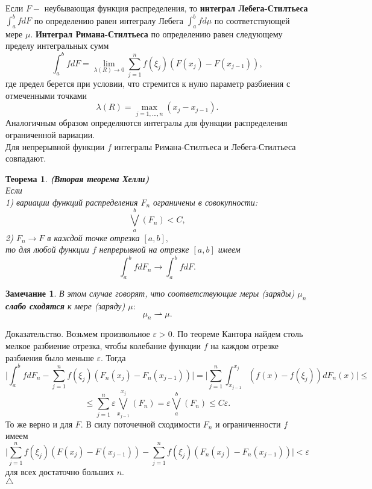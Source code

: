\documentclass[12 pt, a4 paper]{article}
\theoremstyle{plain}   \newtheorem{Pro}{Задача}
\newtheorem{Rem}{Замечание}
\newtheorem{The}{Теорема}
\begin{document}
Если
$ F - $
неубывающая функция распределения, то
{\bfseries интеграл Лебега-Стилтьеса}
$ \int _a ^b f dF $
по определению равен интегралу Лебега
$ \int _a ^b f d \mu $
по соответствующей мере
$ \mu . $
{\bfseries Интеграл Римана-Стилтьеса}
по определению равен следующему пределу интегральных сумм
$$
  \int _a ^b fdF = \lim _{\lambda (R) \rightarrow 0}
  \sum _{j=1}^n f(\xi _j )
  (F(x_j )-F(x_{j-1})),
$$
где предел берется при условии, что стремится к нулю параметр
разбиения с отмеченными точками
$$
  \lambda (R) = \max _{j=1,...,n} (x_j -x_{j-1}).
$$
Аналогичным образом определяются интегралы для функции распределения
ограниченной вариации.\\
Для непрерывной функции
$ f $
интегралы Римана-Стилтьеса и Лебега-Стилтьеса совпадают.
\begin{The}
{\bfseries (Вторая теорема Хелли)}\\
Если\\
1) вариации функций распределения
$ F_n $
ограничены в совокупности:
$$
  \bigvee _a ^b (F_n )<C,
$$
2) $ F_n \rightarrow F $
в каждой точке отрезка
$ [a,b] , $
\\
то для любой функции
$ f $
непрерывной на отрезке
$ [a,b] $
имеем
$$
  \int _a ^b fdF_n \rightarrow \int _a ^b fdF .
$$
\end{The}
\begin{Rem}
В этом случае говорят, что соответствующие меры (заряды)
$ \mu _n $
{\bfseries слабо сходятся}
к мере (заряду)
$ \mu : $
$$
  \mu _n \rightharpoonup \mu .
$$
\end{Rem}
{\Large Доказательство.}
Возьмем произвольное
$ \varepsilon >0 . $
По теореме Кантора найдем столь мелкое разбиение отрезка,
чтобы колебание функции
$ f $
на каждом отрезке разбиения было меньше
$ \varepsilon . $
Тогда
$$
  \biggl | \int _a ^b fdF_n -
  \sum _{j=1}^n f(\xi _j )(F_n (x_j )-F_n (x_{j-1}))
  \biggr | = \biggl | \sum _{j=1}^n \int _{x_{j-1}}^{x_j}
  (f(x)-f(\xi _j ))dF_n (x) \biggr | \leq
$$
$$
  \leq \sum _{j=1}^n \varepsilon \bigvee _{x_{j-1}}^{x_j}
  (F_n ) = \varepsilon \bigvee _a ^b (F_n )
  \leq C \varepsilon .
$$
То же верно и для
$ F . $
В силу поточечной сходимости
$ F_n $
и ограниченности
$ f $
имеем
$$
  \biggl | \sum _{j=1}^n f(\xi _j )(F(x_j )-F(x_{j-1}))-
  \sum _{j=1}^n f(\xi _j )(F_n (x_j )-F_n (x_{j-1})) \biggr |
  < \varepsilon
$$
для всех достаточно больших
$ n . $\\
$ \triangle $
\end{document}
